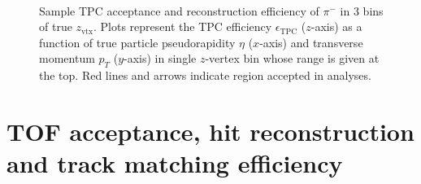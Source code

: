 \begin{figure}[h!]
{\begin{subfigure}[b]{\linewidth}
		\end{subfigure}
	}%
	\quad%
	\parbox{0.485\textwidth}{
		\centering
		\begin{subfigure}[b]{\linewidth}\addtocounter{subfigure}{-2}
		\end{subfigure}\\[5pt]
		\begin{minipage}[t][0.78\linewidth][t]{\linewidth}\vspace{10pt}
		\caption[Sample TPC acceptance and reconstruction efficiency of $\pi^{-}$.]{Sample TPC acceptance and reconstruction efficiency of $\pi^{-}$ in 3 bins of true $z_{\text{vtx}}$. Plots represent the TPC efficiency $\epsilon_{\text{TPC}}$ ($z$-axis) as a function of true particle pseudorapidity $\eta$ ($x$-axis) and transverse momentum $p_{T}$ ($y$-axis) in single $z$-vertex bin whose range is given at the top. Red lines and arrows indicate region accepted in analyses.}\label{fig:tpcEff_pion_sample}
		\end{minipage}
	}
\end{figure}





\section{TOF acceptance, hit reconstruction and track matching efficiency}\label{sec:tofMatchEff}

